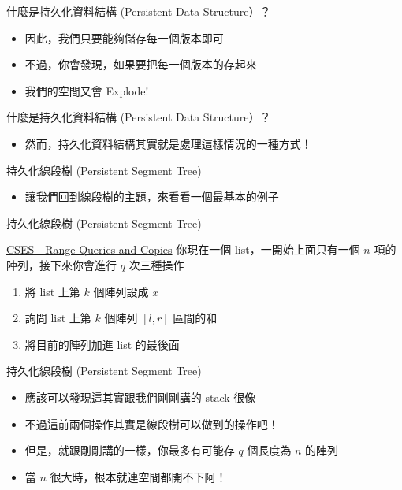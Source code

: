 \documentclass[aspectratio=169]{beamer}
\begin{document}
    \begin{frame}{什麼是持久化資料結構 (Persistent Data Structure）？}
        \begin{itemize}
            \item 因此，我們只要能夠儲存每一個版本即可
            \item 不過，你會發現，如果要把每一個版本的存起來
            \item 我們的空間又會 Explode!
        \end{itemize}
    \end{frame}

    \begin{frame}{什麼是持久化資料結構 (Persistent Data Structure）？}
        \begin{itemize}
            \item 然而，持久化資料結構其實就是處理這樣情況的一種方式！
        \end{itemize}
    \end{frame}

    \begin{frame}{持久化線段樹 (Persistent Segment Tree)}
        \begin{itemize}
            \item 讓我們回到線段樹的主題，來看看一個最基本的例子
        \end{itemize}
    \end{frame}

    \begin{frame}{持久化線段樹 (Persistent Segment Tree)}
        \begin{block}{\href{https://cses.fi/problemset/task/1737}{CSES - Range Queries and Copies}}
            你現在一個 list，一開始上面只有一個 $n$ 項的陣列，接下來你會進行 $q$ 次三種操作
            \begin{enumerate}
                \item 將 list 上第 $k$ 個陣列設成 $x$
                \item 詢問 list 上第 $k$ 個陣列 $[l,r]$ 區間的和
                \item 將目前的陣列加進 list 的最後面
            \end{enumerate}
        \end{block}
    \end{frame}

    \begin{frame}{持久化線段樹 (Persistent Segment Tree)}
        \begin{itemize}
            \item 應該可以發現這其實跟我們剛剛講的 stack 很像
            \item 不過這前兩個操作其實是線段樹可以做到的操作吧！
            \item<2-> 但是，就跟剛剛講的一樣，你最多有可能存 $q$ 個長度為 $n$ 的陣列
            \item<2-> 當 $n$ 很大時，根本就連空間都開不下阿！ 
        \end{itemize}
    \end{frame}
    
\end{document}
